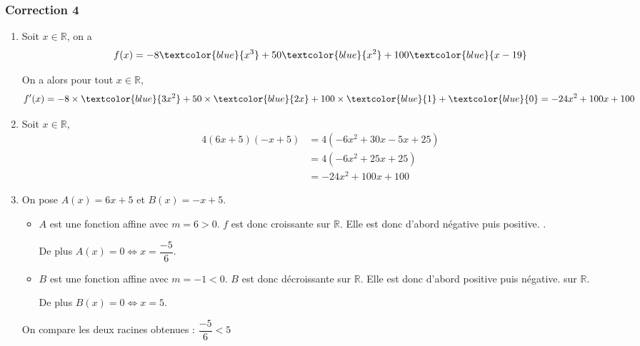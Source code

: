 \documentclass[15pt, mathserif]{beamer}
\newcommand{\R}{\mathbb{R}}			%
\begin{document}
\begin{frame}
\vspace{-10mm}
	\frametitle{Correction 4}
\begin{enumerate} 
 	 \item Soit $x \in \R$, on a $$f(x)=-8\textcolor{blue}{x^3}+50\textcolor{blue}{x^2}+100\textcolor{blue}{x-19}$$
 
 On a alors pour tout $x \in  \R$, $$f'(x)= -8\times \textcolor{blue}{3x^2} +50\times \textcolor{blue}{2x}+100\times \textcolor{blue}{1}+\textcolor{blue}{0}=-24x^2+100x+100$$
 	 \item Soit $x \in \R$, \begin{align*} 
 4(6x+5)(-x+5) & = 4\left( -6x^2 +30x -5x +25\right) \\ 
 &=  4\left( -6x^2 +25x +25\right) \\ 
 &= -24x^2 +100x +100
 \end{align*} \end{enumerate} 
 
 \end{frame} 
 
 \begin{frame} 
 
 \begin{enumerate} 
 \setcounter{enumi}{2} 
 
 	 \item On pose $A(x)= 6x+5$ et $B(x) = -x+5$.
 \bigskip 
 \begin{itemize}
	\item $A$ est une fonction affine avec $m =6>0$. $f$ est donc croissante sur $\mathbb{R}$. Elle est donc d'abord négative puis positive. .

	 De plus $A(x) = 0 \Leftrightarrow x = \dfrac{-5}{6}$. 
 \bigskip 
	\item $B$ est une fonction affine avec $m =-1<0$. $B$ est donc décroissante sur $\mathbb{R}$. Elle est donc d'abord positive puis négative. sur $\mathbb{R}$.

	 De plus $B(x) = 0 \Leftrightarrow x = 5$.
\end{itemize}
 On compare les deux racines obtenues : $ \dfrac{-5}{6} < 5$ 
 \end{enumerate} 
 
 \end{frame}
\end{document}
